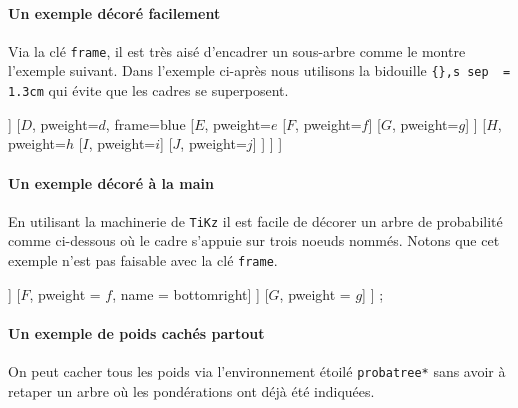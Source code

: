 \documentclass[12pt,a4paper]{article}
\theoremstyle{definition}
\begin{document}
\paragraph{Un exemple décoré facilement}

Via la clé \verb+frame+, il est très aisé d'encadrer un sous-arbre comme le montre l'exemple suivant. Dans l'exemple ci-après nous utilisons la bidouille \verb+{},s sep  = 1.3cm+ qui évite que les cadres se superposent.

\begin{tcblisting}{}
\begin{probatree}
[{},s sep  = 1.3cm
    [$A$, pweight=$a$, frame=red
        [$B$, pweight=$b$]
        [$C$, pweight=$c$]
    ]
    [$D$, pweight=$d$, frame=blue
        [$E$, pweight=$e$
            [$F$, pweight=$f$]
            [$G$, pweight=$g$]
        ]
        [$H$, pweight=$h$
            [$I$, pweight=$i$]
            [$J$, pweight=$j$]
        ]
    ]
]
\end{probatree}
\end{tcblisting}


\paragraph{Un exemple décoré à la main}

En utilisant la machinerie de \verb+TiKz+ il est facile de décorer un arbre de probabilité comme ci-dessous où le cadre s'appuie sur trois noeuds nommés. Notons que cet exemple n'est pas faisable avec la clé \verb+frame+.

\begin{tcblisting}{}
\begin{probatree}
[
    [$A$, pweight = $a$, name = left
        [$B$, pweight = $b$, name = topright
            [$C$, pweight = $c$]
            [$D$, pweight = $d$]
           ]
        [$F$, pweight = $f$, name = bottomright]
    ]
    [$G$, pweight = $g$]
]
\node[draw = blue, thick, rounded corners, fit = (left)(topright)(bottomright)] {};
\end{probatree}
\end{tcblisting}



\paragraph{Un exemple de poids cachés partout}

On peut cacher tous les poids via l'environnement étoilé \verb+probatree*+ sans avoir à retaper un arbre où les pondérations ont déjà été indiquées.
\end{document}
